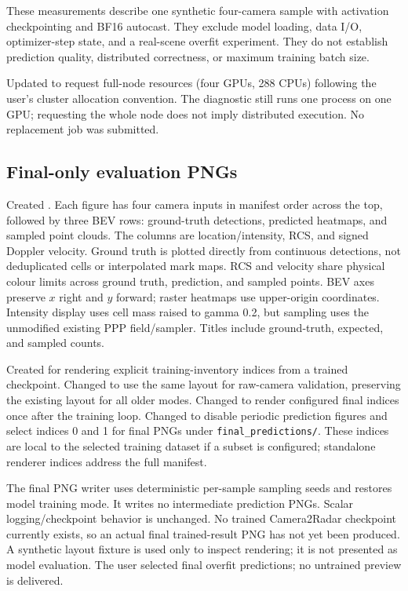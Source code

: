 \documentclass[11pt,a4paper]{article}
\begin{document}
These measurements describe one synthetic four-camera sample with activation checkpointing and BF16 autocast. They exclude model loading, data I/O, optimizer-step state, and a real-scene overfit experiment. They do not establish prediction quality, distributed correctness, or maximum training batch size.

Updated  to request full-node resources (four GPUs, 288 CPUs) following the user's cluster allocation convention. The diagnostic still runs one process on one GPU; requesting the whole node does not imply distributed execution. No replacement job was submitted.

\subsection{Final-only evaluation PNGs}
Created . Each figure has four camera inputs in manifest order across the top, followed by three BEV rows: ground-truth detections, predicted heatmaps, and sampled point clouds. The columns are location/intensity, RCS, and signed Doppler velocity. Ground truth is plotted directly from continuous detections, not deduplicated cells or interpolated mark maps. RCS and velocity share physical colour limits across ground truth, prediction, and sampled points. BEV axes preserve $x$ right and $y$ forward; raster heatmaps use upper-origin coordinates. Intensity display uses cell mass raised to gamma 0.2, but sampling uses the unmodified existing PPP field/sampler. Titles include ground-truth, expected, and sampled counts.

Created  for rendering explicit training-inventory indices from a trained checkpoint. Changed  to use the same layout for raw-camera validation, preserving the existing layout for all older modes. Changed  to render configured final indices once after the training loop. Changed  to disable periodic prediction figures and select indices 0 and 1 for final PNGs under \texttt{final\_predictions/}. These indices are local to the selected training dataset if a subset is configured; standalone renderer indices address the full manifest.

The final PNG writer uses deterministic per-sample sampling seeds and restores model training mode. It writes no intermediate prediction PNGs. Scalar logging/checkpoint behavior is unchanged. No trained Camera2Radar checkpoint currently exists, so an actual final trained-result PNG has not yet been produced. A synthetic layout fixture is used only to inspect rendering; it is not presented as model evaluation. The user selected final overfit predictions; no untrained preview is delivered.
\end{document}
